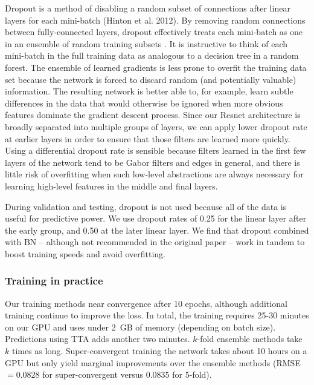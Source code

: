 \documentclass[fleqn,usenatbib]{mnras}
\begin{document}
Dropout is a method of disabling a random subset of connections after linear layers for each mini-batch (Hinton et al. 2012).
By removing random connections between fully-connected layers, dropout effectively treats each mini-batch as one in an ensemble of random training subsets .
It is instructive to think of each mini-batch in the full training data as analogous to a decision tree in a random forest.
The ensemble of learned gradients is less prone to overfit the training data set because the network is forced to discard random (and potentially valuable) information.
The resulting network is better able to, for example, learn subtle differences in the data that would otherwise be ignored when more obvious features dominate the gradient descent process.
Since our Resnet architecture is broadly separated into multiple groups of layers, we can apply lower dropout rate at earlier layers in order to ensure that those filters are learned more quickly.
Using a differential dropout rate is sensible because filters learned in the first few layers of the network tend to be Gabor filters and edges in general, and there is little risk of overfitting when such low-level abstractions are always necessary for learning high-level features in the middle and final layers.

During validation and testing, dropout is not used because all of the data is useful for predictive power.
We use dropout rates of 0.25 for the linear layer after the early group, and 0.50 at the later linear layer.
We find that dropout combined with BN -- although not recommended in the original paper -- work in tandem to boost training speeds and avoid overfitting.


\subsubsection{Training in practice}

Our training methods near convergence after 10 epochs, although additional training continue to improve the loss.
In total, the training requires 25-30 minutes on our GPU and uses under 2~GB of memory (depending on batch size).
Predictions using TTA adds another two minutes.
$k$-fold ensemble methods take $k$ times as long.
Super-convergent training the network takes about 10 hours on a GPU but only yield marginal improvements over the ensemble methods (RMSE~$= 0.0828$ for super-convergent versus $0.0835$ for 5-fold).
\end{document}
